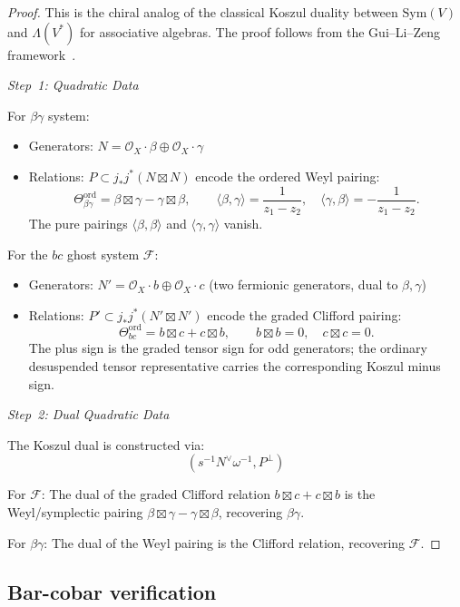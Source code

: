 \begin{proof}
This is the chiral analog of the classical Koszul duality between $\text{Sym}(V)$ and $\Lambda(V^*)$
for associative algebras. The proof follows from the Gui--Li--Zeng framework~\cite{GLZ22}.

\emph{Step~1: Quadratic Data}

For $\beta\gamma$ system:
\begin{itemize}
\item Generators: $N = \mathcal{O}_X \cdot \beta \oplus \mathcal{O}_X \cdot \gamma$
\item Relations: $P \subset j_* j^*(N \boxtimes N)$ encode the ordered Weyl pairing:
\[
\Theta_{\beta\gamma}^{\mathrm{ord}}
=\beta \boxtimes \gamma-\gamma \boxtimes \beta,
\qquad
\langle \beta, \gamma \rangle = \frac{1}{z_1 - z_2}, \quad
\langle \gamma, \beta \rangle = -\frac{1}{z_1-z_2}.
\]
The pure pairings $\langle \beta,\beta\rangle$ and
$\langle\gamma,\gamma\rangle$ vanish.
\end{itemize}

For the $bc$ ghost system $\mathcal{F}$:
\begin{itemize}
\item Generators: $N' = \mathcal{O}_X \cdot b \oplus \mathcal{O}_X \cdot c$ (two fermionic generators, dual to $\beta, \gamma$)
\item Relations: $P' \subset j_* j^*(N' \boxtimes N')$ encode the graded Clifford pairing:
\[
\Theta_{bc}^{\mathrm{ord}}
=b \boxtimes c+c \boxtimes b,
\qquad
b \boxtimes b=0,\quad c\boxtimes c=0.
\]
The plus sign is the graded tensor sign for odd generators; the
ordinary desuspended tensor representative carries the corresponding
Koszul minus sign.
\end{itemize}

\emph{Step~2: Dual Quadratic Data}

The Koszul dual is constructed via:
\[(s^{-1}N^{\vee}\omega^{-1}, P^{\perp})\]

For $\mathcal{F}$: The dual of the graded Clifford relation
$b \boxtimes c + c \boxtimes b$ is the Weyl/symplectic pairing
$\beta \boxtimes \gamma - \gamma \boxtimes \beta$, recovering
$\beta\gamma$.

For $\beta\gamma$: The dual of the Weyl pairing is the Clifford relation, recovering $\mathcal{F}$.
\end{proof}

\subsection{Bar-cobar verification}
\label{subsec:bar-cobar-verification}

